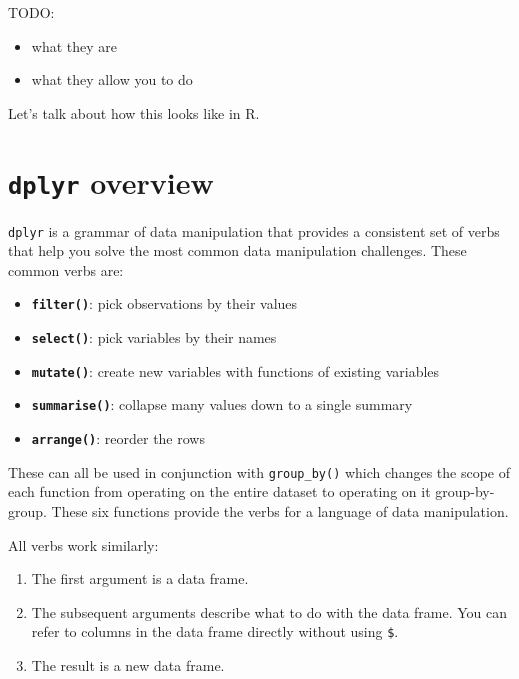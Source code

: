 \documentclass[]{book}
\providecommand{\tightlist}{%
  \setlength{\itemsep}{0pt}\setlength{\parskip}{0pt}}
\begin{document}
TODO:

\begin{itemize}
\tightlist
\item
  what they are
\item
  what they allow you to do
\end{itemize}

Let's talk about how this looks like in R.

\hypertarget{dplyr-overview}{%
\section{\texorpdfstring{\texttt{dplyr} overview}{dplyr overview}}\label{dplyr-overview}}

\texttt{dplyr} is a grammar of data manipulation that provides a consistent set of verbs that help you solve the most common data manipulation challenges. These common verbs are:

\begin{itemize}
\item
  \textbf{\texttt{filter()}}: pick observations by their values
\item
  \textbf{\texttt{select()}}: pick variables by their names
\item
  \textbf{\texttt{mutate()}}: create new variables with functions of existing variables
\item
  \textbf{\texttt{summarise()}}: collapse many values down to a single summary
\item
  \textbf{\texttt{arrange()}}: reorder the rows
\end{itemize}

These can all be used in conjunction with \texttt{group\_by()} which changes the scope of each function from operating on the entire dataset to operating on it group-by-group. These six functions provide the verbs for a language of data manipulation.

All verbs work similarly:

\begin{enumerate}
\def\labelenumi{\arabic{enumi}.}
\tightlist
\item
  The first argument is a data frame.
\item
  The subsequent arguments describe what to do with the data frame. You can refer to columns in the data frame directly without using \texttt{\$}.
\item
  The result is a new data frame.
\end{enumerate}
\end{document}
